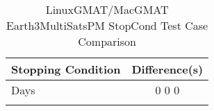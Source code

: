 \begin{table}[htbp!]
\centering
\caption{ LinuxGMAT/MacGMAT Earth3MultiSatsPM StopCond Test Case Comparison}
      \begin{tabular}{lc}
      \hline\hline
          Stopping Condition & Difference(s) \\
         \hline
         Days &  0 0 0 \\
      \hline\hline
      \label{Table: LinuxGMAT-MacGMAT Earth3MultiSatsPM StopCond Table} 
\end{tabular}
\end{table}
